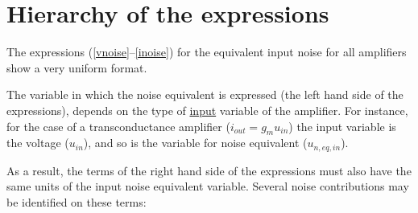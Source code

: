 \documentclass{ecctd01}
\begin{document}
\section{Hierarchy of the expressions}
The expressions (\ref{vnoise}--\ref{inoise}) for the equivalent input
noise for all amplifiers show a very uniform format.
\par
The variable in which the noise equivalent is expressed (the left hand side
of the expressions), depends on the type of
\underline{input} variable of the
amplifier. For instance, for the case of
a transconductance amplifier ($i_{out} = g_m u_{in}$) the input variable
is the voltage ($u_{in}$), and so is the variable for noise equivalent
($u_{n,eq,in}$).
\par
As a result, the terms of the right hand side of the expressions must
also have the same units of the input noise equivalent variable.
Several noise contributions may be identified on these terms:\vspace{-1.0ex}
\end{document}
